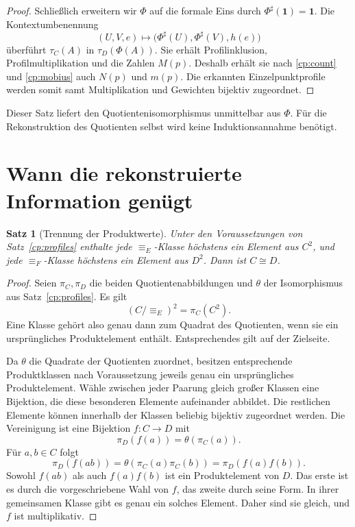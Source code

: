 \documentclass[a4paper,11pt]{article}
\newtheorem{satz}{Satz}
\begin{document}
\begin{proof}
Schließlich erweitern wir \(\Phi\) auf die formale Eins durch
\(\Phi^\sharp(\mathbf1)=\mathbf1\). Die Kontextumbenennung
\[
 (U,V,e)\longmapsto
 \bigl(\Phi^\sharp(U),\Phi^\sharp(V),h(e)\bigr)
\]
überführt \(\tau_C(A)\) in \(\tau_D(\Phi(A))\). Sie erhält
Profilinklusion, Profilmultiplikation und die Zahlen \(M(p)\).
Deshalb erhält sie nach \eqref{cp:count} und \eqref{cp:mobius}
auch \(N(p)\) und \(m(p)\). Die erkannten Einzelpunktprofile werden
somit samt Multiplikation und Gewichten bijektiv zugeordnet.
\end{proof}

Dieser Satz liefert den Quotientenisomorphismus unmittelbar aus
\(\Phi\). Für die Rekonstruktion des Quotienten selbst wird keine
Induktionsannahme benötigt.

\section{Wann die rekonstruierte Information genügt}

\begin{satz}[Trennung der Produktwerte]\label{cp:separation}
Unter den Voraussetzungen von Satz~\ref{cp:profiles} enthalte jede
\(\equiv_E\)-Klasse höchstens ein Element aus \(C^2\), und jede
\(\equiv_F\)-Klasse höchstens ein Element aus \(D^2\). Dann ist
\(C\cong D\).
\end{satz}

\begin{proof}
Seien \(\pi_C,\pi_D\) die beiden Quotientenabbildungen und
\(\theta\) der Isomorphismus aus Satz~\ref{cp:profiles}. Es gilt
\[
 (C/{\equiv_E})^2=\pi_C(C^2).
\]
Eine Klasse gehört also genau dann zum Quadrat des Quotienten,
wenn sie ein ursprüngliches Produktelement enthält. Entsprechendes
gilt auf der Zielseite.

Da \(\theta\) die Quadrate der Quotienten zuordnet, besitzen
entsprechende Produktklassen nach Voraussetzung jeweils genau ein
ursprüngliches Produktelement. Wähle zwischen jeder Paarung gleich
großer Klassen eine Bijektion, die diese besonderen Elemente
aufeinander abbildet. Die restlichen Elemente können innerhalb der
Klassen beliebig bijektiv zugeordnet werden. Die Vereinigung ist eine
Bijektion \(f:C\to D\) mit
\[
 \pi_D(f(a))=\theta(\pi_C(a)).
\]
Für \(a,b\in C\) folgt
\[
 \pi_D(f(ab))
 =\theta(\pi_C(a)\pi_C(b))
 =\pi_D(f(a)f(b)).
\]
Sowohl \(f(ab)\) als auch \(f(a)f(b)\) ist ein Produktelement von
\(D\). Das erste ist es durch die vorgeschriebene Wahl von \(f\),
das zweite durch seine Form. In ihrer gemeinsamen Klasse gibt es
genau ein solches Element. Daher sind sie gleich, und \(f\) ist
multiplikativ.
\end{proof}
\end{document}

